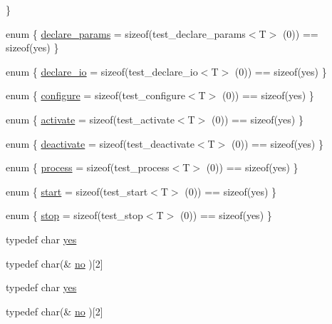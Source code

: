\begin{DoxyCompactItemize}
 \}
\item 
enum \{ \hyperlink{structecto_1_1has__f_a8998dcad6a2d7da6cd0b1158089c6d08ae56dbd7ffd8a284535cce3d5af3580a7}{declare\-\_\-params} = sizeof(test\-\_\-declare\-\_\-params$<$T$>$ (0)) == sizeof(yes)
 \}
\item 
enum \{ \hyperlink{structecto_1_1has__f_af2f06fa91e667772be9731d32548b94ca46e5e9b2bb07bc150e6f74c17e53ab33}{declare\-\_\-io} = sizeof(test\-\_\-declare\-\_\-io$<$T$>$ (0)) == sizeof(yes)
 \}
\item 
enum \{ \hyperlink{structecto_1_1has__f_a1958eba96f4107abadfe89cc067a42f9ae94b70f5e1b17c668eb0a405c2935209}{configure} = sizeof(test\-\_\-configure$<$T$>$ (0)) == sizeof(yes)
 \}
\item 
enum \{ \hyperlink{structecto_1_1has__f_a6d7dc18b2e3dc6e2466a405c13088084af52c138881600722d08741fffb3db5d8}{activate} = sizeof(test\-\_\-activate$<$T$>$ (0)) == sizeof(yes)
 \}
\item 
enum \{ \hyperlink{structecto_1_1has__f_a84ef2fb38c7882e9e6cc4e1f62ad88bdaaafdc40ecd57b016fa5205b75d01907e}{deactivate} = sizeof(test\-\_\-deactivate$<$T$>$ (0)) == sizeof(yes)
 \}
\item 
enum \{ \hyperlink{structecto_1_1has__f_acd60d393d00729a96f6407840b97a52aa2aa0b5c6e604720562dfc0c11fb509a4}{process} = sizeof(test\-\_\-process$<$T$>$ (0)) == sizeof(yes)
 \}
\item 
enum \{ \hyperlink{structecto_1_1has__f_ab8a599463b6343f6af4c1f465284d2b2ac7031abc908db36ec1b498167454340e}{start} = sizeof(test\-\_\-start$<$T$>$ (0)) == sizeof(yes)
 \}
\item 
enum \{ \hyperlink{structecto_1_1has__f_a9992271f06f38c11ce0df64bf2f71570a97bc71e1e9d2872882dd1d067c95770d}{stop} = sizeof(test\-\_\-stop$<$T$>$ (0)) == sizeof(yes)
 \}
\item 
typedef char \hyperlink{structecto_1_1has__f_a3fb902f1eed02919195aff1a6b28eb76}{yes}
\item 
typedef char(\& \hyperlink{structecto_1_1has__f_ae0c6da775cf20caed616e24681af2807}{no} )\mbox{[}2\mbox{]}
\item 
typedef char \hyperlink{structecto_1_1has__f_a3fb902f1eed02919195aff1a6b28eb76}{yes}
\item 
typedef char(\& \hyperlink{structecto_1_1has__f_ae0c6da775cf20caed616e24681af2807}{no} )\mbox{[}2\mbox{]}
\end{DoxyCompactItemize}
